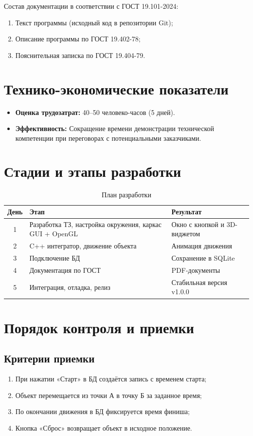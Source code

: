 \documentclass[a4paper,14pt]{extarticle}
\begin{document}
Состав документации в соответствии с ГОСТ 19.101-2024:
\begin{enumerate}
    \item Текст программы (исходный код в репозитории Git);
    \item Описание программы по ГОСТ 19.402-78;
    \item Пояснительная записка по ГОСТ 19.404-79.
\end{enumerate}

\section{Технико-экономические показатели}

\begin{itemize}
    \item \textbf{Оценка трудозатрат:} 40–50 человеко-часов (5 дней).
    \item \textbf{Эффективность:} Сокращение времени демонстрации технической компетенции при переговорах с потенциальными заказчиками.
\end{itemize}

\section{Стадии и этапы разработки}

\begin{table}[H]
\centering
\begin{tabular}{|c|l|l|}
\hline
\textbf{День} & \textbf{Этап} & \textbf{Результат} \\
\hline
1 & Разработка ТЗ, настройка окружения, каркас GUI + OpenGL & Окно с кнопкой и 3D-виджетом \\
\hline
2 & C++ интегратор, движение объекта & Анимация движения \\
\hline
3 & Подключение БД & Сохранение в SQLite \\
\hline
4 & Документация по ГОСТ & PDF-документы \\
\hline
5 & Интеграция, отладка, релиз & Стабильная версия v1.0.0 \\
\hline
\end{tabular}
\caption{План разработки}
\end{table}

\section{Порядок контроля и приемки}

\subsection{Критерии приемки}
\begin{enumerate}
    \item При нажатии «Старт» в БД создаётся запись с временем старта;
    \item Объект перемещается из точки А в точку Б за заданное время;
    \item По окончании движения в БД фиксируется время финиша;
    \item Кнопка «Сброс» возвращает объект в исходное положение.
\end{enumerate}
\end{document}
